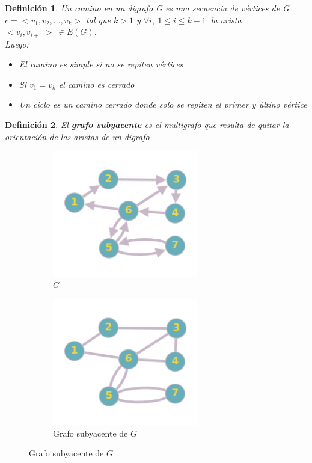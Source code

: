 \documentclass[a4paper,1pt]{report}
\newtheorem*{dfn}{Definición}
\begin{document}
\begin{dfn}
 Un camino en un digrafo G es una secuencia de vértices de G $c=<v_1,v_2,\dots,v_k>$ tal que $k>1$ y $\forall i, \ 1 \leq i \leq k-1\ $ la arista $<v_i, v_{i+1}> \ \in E(G)$.
\\
Luego:
\begin{itemize}
 \item El camino es simple si no se repiten vértices
 \item Si $v_1=v_k$ el camino es cerrado
 \item Un ciclo es un camino cerrado donde solo se repiten el primer y últino vértice
\end{itemize}

\end{dfn}

\begin{dfn}
 El \textbf{grafo subyacente} es el multigrafo que resulta de quitar la orientación de las aristas de un digrafo
\end{dfn}
\begin{figure}[H]
    \centering
    \begin{subfigure}[b]{0.45\textwidth}
        \centering
        \includegraphics[width=0.7\textwidth]{figures8/digrafo.png}
        \caption{$G$}
    \end{subfigure} 
        \begin{subfigure}[b]{0.45\textwidth}
        \centering
        \includegraphics[width=0.7\textwidth]{figures8/Gsubyecente.png}
        \caption{Grafo subyacente de $G$}
         \end{subfigure} 
\end{figure} 
\end{document}
